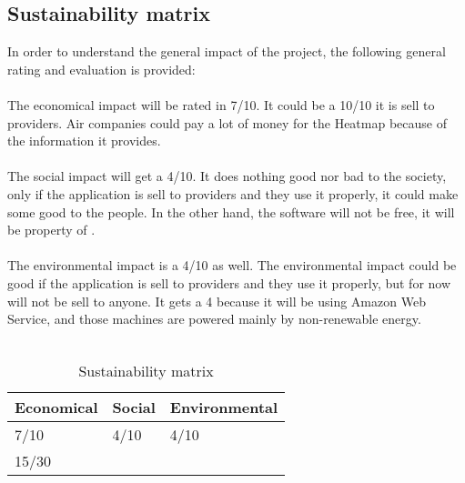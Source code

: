 \subsection{Sustainability matrix}

In order to understand the general impact of the project, the following general rating and evaluation is provided:
\\\\
The economical impact will be rated in 7/10. It could be a 10/10 it is sell to providers. Air companies could pay a lot of money for the Heatmap because of the information it provides.
\\\\
The social impact will get a 4/10. It does nothing good nor bad to the society, only if the application is sell to providers and they use it properly, it could make some good to the people. In the other hand, the software will not be free, it will be property of \company.
\\\\
The environmental impact is a 4/10 as well. The environmental impact could be good if the application is sell to providers and they use it properly, but for now will not be sell to anyone. It gets a 4 because it will be using Amazon Web Service, and those machines are powered mainly by non-renewable energy\cite{click_clean}.
\\\\

\begin{table}[H]
\centering
\begin{tabular}{|l|l|l|}
\hline
Economical & Social & Environmental \\ \hline
7/10       & 4/10   & 4/10          \\ \hline
\multicolumn{3}{|l|}{15/30}         \\ \hline
\end{tabular}
\caption{Sustainability matrix}
\label{sustainability-matrix}
\end{table}


